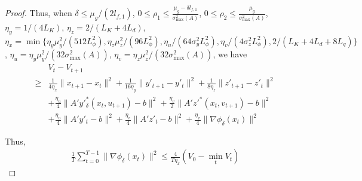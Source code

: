 \documentclass[10pt,a4paper]{amsart}
\begin{document}
\begin{proof}
Thus, when  $\delta\leq \mu_g/(2l_{f,1})$, $0\leq \rho_1\leq \frac{\mu_g-\delta l_{f,1}}{\sigma_{\max}^2(A)}$, $0\leq \rho_2\leq \frac{\mu_g}{\sigma_{\max}^2(A)}$, $\eta_y=1/(4L_K)$, $\eta_z=2/(L_K+4L_d)$, $\eta_x=\min\{\eta_y\mu_y^2/(512L_\phi^2), \eta_z\mu_z^2/(96L_\phi^2), \eta_u/(64\sigma_y^2L_\phi^2), \eta_v/(4\sigma_z^2L_\phi^2), 2/(L_K+4L_d+8L_q)\}$, $\eta_u=\eta_y\mu_y^2/(32\sigma_{\max}^2(A))$, $\eta_v=\eta_z\mu_z^2/(32\sigma_{\max}^2(A))$, we have
\begin{align}\nonumber
    &V_t-V_{t+1}\\ \nonumber
    \geq&\frac{1}{4\eta_x}\|x_{t+1}-x_t\|^2+\frac{1}{16\eta_y}\|y'_{t+1}-y'_t\|^2+\frac{1}{8\eta_z}\|z'_{t+1}-z'_t\|^2\\ \nonumber
    &+\frac{\eta_u}{4}\|A'y'^*_\delta(x_t,u_{t+1})-b\|^2+\frac{\eta_v}{2}\|A'z'^*(x_t,v_{t+1})-b\|^2\\ 
    &+\frac{\eta_u}{4}\|A'y'_t-b\|^2+\frac{\eta_v}{4}\|A'z'_t-b\|^2+\frac{\eta_x}{4}\|\nabla \phi_\delta(x_t)\|^2 \label{eq: v}
\end{align}


Thus,
     \begin{align}\label{nabla h}
        \frac{1}{T}\sum_{t=0}^{T-1}\|\nabla \phi_\delta(x_{t})\|^2\leq \frac{4}{T\eta_x}(V_0-\min_tV_t )
    \end{align}  



\end{proof}
\end{document}
